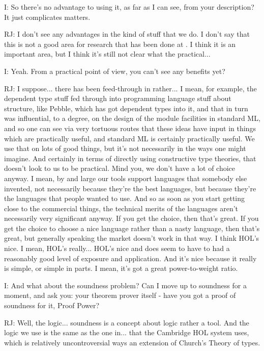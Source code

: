 \documentclass[10pt,titlepage]{book}
\begin{document}
I: So there's no advantage to using it, as far as I can see, from your description? It just complicates matters.

RJ: I don't see any advantages in the kind of stuff that we do. I don't say that this is not a good area for research that has been done at	. I think it is an important area, but I think it's still not clear what the practical...

I: Yeah. From a practical point of view, you can't see any benefits yet?

RJ: I suppose... there has been feed-through in rather... I mean, for example, the dependent type stuff fed through into programming language stuff about structure, like Pebble, which has got dependent types into it, and that in turn was influential, to a degree, on the design of the module facilities in standard ML, and so one can see via very tortuous routes that these ideas have input in things which are practically useful, and standard ML is certainly practically useful. We use that on lots of good things, but it's not necessarily in the ways one might imagine. And certainly in terms of directly using constructive type theories, that doesn't look to us to be practical. Mind you, we don't have a lot of choice anyway. I mean, by and large our tools support languages that somebody else invented, not necessarily because they're the best languages, but because they're the languages that people wanted to use. And so as soon as you start getting close to the commercial things, the technical merits of the languages aren't necessarily very significant anyway. If you get the choice, then that's great. If you get the choice to choose a nice language rather than a nasty language, then that's great, but generally speaking the market doesn't work in that way. I think HOL's nice. I mean, HOL's really... HOL's nice and does seem to have to had a reasonably good level of exposure and application. And it's nice because it really is simple, or simple in parts. I mean, it's got a great power-to-weight ratio.

I: And what about the soundness problem? Can I move up to soundness for a moment, and ask you: your theorem prover itself - have you got a proof of soundness for it, Proof Power?

RJ: Well, the logic... soundness is a concept about logic rather a tool. And the logic we use is the same as the one in... that the Cambridge HOL system uses, which is relatively uncontroversial ways an extension of Church's Theory of types.
\end{document}
